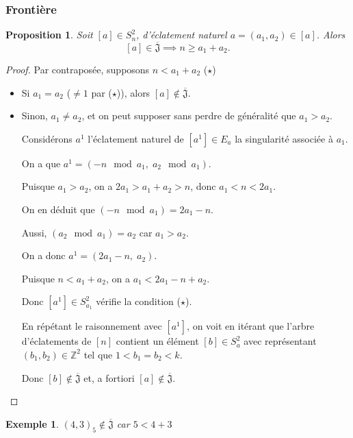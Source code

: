 \documentclass{article}
\newtheorem{proposition}{Proposition}
\newtheorem{example}{Exemple}
\newcommand{\J}{\mathfrak{J}}
\newcommand{\JS}{\overline{\J}}
\begin{document}
\subsubsection{Frontière}

\begin{proposition}
    Soit $[a] \in S_n^2$, d'éclatement naturel $a = (a_1, a_2) \in [a]$. Alors
    \[ [a] \in \JS \implies n \geq a_1 + a_2. \]
\end{proposition} 

\begin{proof}
    Par contraposée, supposons $n < a_1 + a_2$ ($\star$)

    \begin{itemize}
        \item Si $a_1 = a_2$ ($\neq 1$ par ($\star$)), alors $[a] \not \in \JS$.
        \item Sinon, $a_1 \neq a_2$, et on peut supposer sans perdre de généralité que $a_1 > a_2$.

            Considérons $a^1$ l'éclatement naturel de $[a^1] \in E_a$ la singularité associée à $a_1$.

            On a que $a^1 = (-n \mod a_1,\; a_2 \mod a_1)$.

            Puisque $a_1 > a_2$, on a $2a_1 > a_1 + a_2 > n$, donc $a_1 < n < 2a_1$.
                
            On en déduit que $(-n \mod a_1) = 2a_1 - n$.

            Aussi, $(a_2 \mod a_1) = a_2$ car $a_1 > a_2$.

            On a donc $a^1 = (2a_1-n,\; a_2)$.

            Puisque $n < a_1 + a_2$, on a $a_1 < 2a_1 - n + a_2$.

            Donc $[a^1] \in S_{a_1}^2$ vérifie la condition ($\star$). 
            
            En répétant le raisonnement avec $[a^1]$, 
            on voit en itérant que l'arbre d'éclatements de $[n]$ 
            contient un élément $[b] \in S_a^2$ avec représentant 
            $(b_1, b_2) \in \mathbb{Z}^2$ tel que $1 < b_1 = b_2 < k$.

            Donc $[b] \not \in \JS$ et, a fortiori $[a] \not \in \JS$.
    \end{itemize}
\end{proof}

\begin{example}
    ${(4, 3)}_5 \not \in \JS$ car $5 < 4 + 3$
\end{example}
\end{document}
